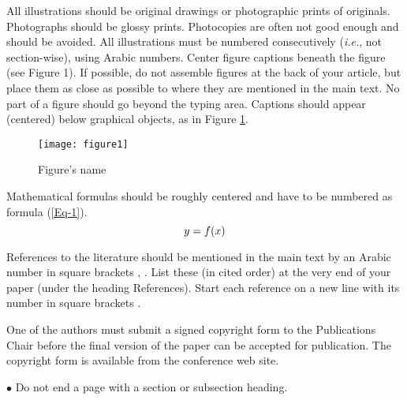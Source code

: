 \documentclass[a4paper, times, 10pt,twocolumn]{article}
\begin{document}
All illustrations should be original drawings or photographic prints
of originals. Photographs should be glossy prints. Photocopies are
often not good enough and should be avoided. All illustrations must
be numbered consecutively (\textit{i.e.}, not section-wise), using Arabic
numbers.  Center figure captions beneath the figure (see Figure 1).
If possible, do not assemble figures at the back of your article,
but place them as close as possible to where they are mentioned in
the main text. No part of a figure should go beyond the typing area.
Captions should appear (centered) below graphical objects, as in
Figure \ref{Fig:Figure 1}.
\begin{figure}[h]
\centering
\texttt{[image: figure1]}
\caption{Figure's name} \label{Fig:Figure 1}
\end{figure}


Mathematical formulas should be roughly centered and have to be
numbered as formula (\ref{Eq-1}).
\begin{equation}\label{Eq-1}
\centering{y=f(x)}
\end{equation}


References to the literature should be mentioned in the main text by
an Arabic number in square brackets \cite{Peter}, \cite{John}. List
these (in cited order) at the very end of your paper (under the
heading References). Start each reference on a new line with its
number in square brackets \cite{Xizhao}.


One of the authors must submit a signed copyright form to the
Publications Chair before the final version of the paper can be
accepted for publication. The copyright form is available from the
conference web site.

\hspace{-3ex}    $\bullet$ \hspace{1ex} Do not end a page with a
section or subsection heading.
\end{document}
